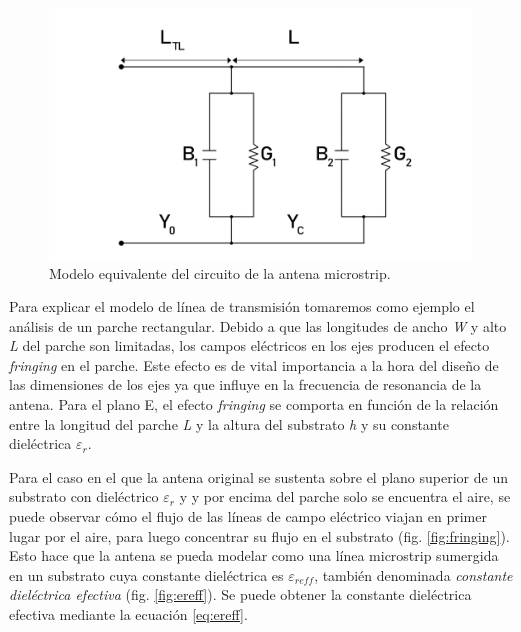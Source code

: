 \begin{figure}[h]
    \centering
        \includegraphics[width=12cm]{archivos/parche/circuito}
        \caption{Modelo equivalente del circuito de la antena microstrip.}
        \label{fig:modelo}
\end{figure}

\par Para explicar el modelo de línea de transmisión tomaremos como ejemplo el análisis de un parche rectangular. Debido a que las longitudes de ancho \textit{W} y alto \textit{L} del parche son limitadas, los campos eléctricos en los ejes producen el efecto \textit{fringing} en el parche. Este efecto es de vital importancia a la hora del diseño de las dimensiones de los ejes ya que influye en la frecuencia de resonancia de la antena. Para el plano E, el efecto \textit{fringing} se comporta en función de la relación entre la longitud del parche \textit{L} y la altura del substrato \textit{h} y su constante dieléctrica \textit{$\varepsilon_{r}$}. 
\\
\par  Para el caso en el que la antena original se sustenta sobre el plano superior de un substrato con dieléctrico \textit{$\varepsilon_{r}$} y y por encima del parche solo se encuentra el aire, se puede observar cómo el flujo de las líneas de campo eléctrico viajan en primer lugar por el aire, para luego concentrar su flujo en el substrato (fig. \ref{fig:fringing}). Esto hace que la antena se pueda modelar como una línea microstrip sumergida en un substrato cuya constante dieléctrica es $\varepsilon_{reff}$, también denominada \textit{constante dieléctrica efectiva} (fig. \ref{fig:ereff}). Se puede obtener la constante dieléctrica efectiva mediante la ecuación \ref{eq:ereff}.

